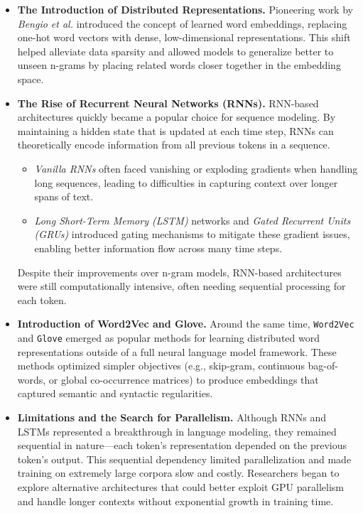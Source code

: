 \begin{itemize}
    \item \textbf{The Introduction of Distributed Representations.}
    Pioneering work by \emph{Bengio et al.} introduced the concept of learned word embeddings, replacing one-hot word vectors with dense, low-dimensional representations. This shift helped alleviate data sparsity and allowed models to generalize better to unseen n-grams by placing related words closer together in the embedding space.

    \item \textbf{The Rise of Recurrent Neural Networks (RNNs).}
    RNN-based architectures quickly became a popular choice for sequence modeling. By maintaining a hidden state that is updated at each time step, RNNs can theoretically encode information from all previous tokens in a sequence. 
    \begin{itemize}
        \item \textit{Vanilla RNNs} often faced vanishing or exploding gradients when handling long sequences, leading to difficulties in capturing context over longer spans of text.
        \item \textit{Long Short-Term Memory (LSTM)} networks and \textit{Gated Recurrent Units (GRUs)} introduced gating mechanisms to mitigate these gradient issues, enabling better information flow across many time steps.
    \end{itemize}
    Despite their improvements over n-gram models, RNN-based architectures were still computationally intensive, often needing sequential processing for each token.

    \item \textbf{Introduction of Word2Vec and Glove.}
    Around the same time, \texttt{Word2Vec} and \texttt{Glove} emerged as popular methods for learning distributed word representations outside of a full neural language model framework. These methods optimized simpler objectives (e.g., skip-gram, continuous bag-of-words, or global co-occurrence matrices) to produce embeddings that captured semantic and syntactic regularities.

    \item \textbf{Limitations and the Search for Parallelism.}
    Although RNNs and LSTMs represented a breakthrough in language modeling, they remained sequential in nature—each token’s representation depended on the previous token’s output. This sequential dependency limited parallelization and made training on extremely large corpora slow and costly. Researchers began to explore alternative architectures that could better exploit GPU parallelism and handle longer contexts without exponential growth in training time.
\end{itemize}

